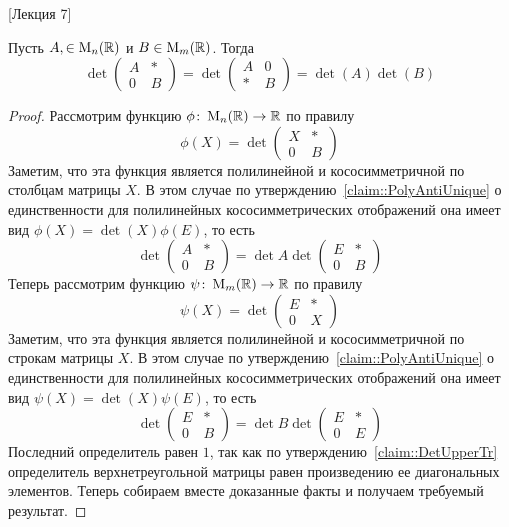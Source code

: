 [Лекция 7]


\begin{claim}
Пусть $A,\in\operatorname{M}_{n}(\mathbb R)$ и $B\in\operatorname{M}_{m}(\mathbb R)$. Тогда
\[
\det
\begin{pmatrix}
{A}&{*}\\
{0}&{B}
\end{pmatrix}
=
\det
\begin{pmatrix}
{A}&{0}\\
{*}&{B}
\end{pmatrix}
=
\det(A) \det(B)
\]
\end{claim}
\begin{proof}
Рассмотрим функцию $\phi\colon \operatorname{M}_{n}(\mathbb R)\to \mathbb R$ по правилу
\[
\phi(X) = 
\det
\begin{pmatrix}
{X}&{*}\\
{0}&{B}
\end{pmatrix}
\]
Заметим, что эта функция является полилинейной и кососимметричной по столбцам матрицы $X$. В этом случае по утверждению~\ref{claim::PolyAntiUnique} о единственности для полилинейных кососимметрических отображений она имеет вид $\phi(X) = \det(X)\phi(E)$, то есть
\[
\det
\begin{pmatrix}
{A}&{*}\\
{0}&{B}
\end{pmatrix}
=
\det A
\det
\begin{pmatrix}
{E}&{*}\\
{0}&{B}
\end{pmatrix}
\]
Теперь рассмотрим функцию $\psi\colon \operatorname{M}_{m}(\mathbb R)\to \mathbb R$ по правилу
\[
\psi(X) =
\det
\begin{pmatrix}
{E}&{*}\\
{0}&{X}
\end{pmatrix}
\]
Заметим, что эта функция является полилинейной и кососимметричной по строкам матрицы $X$. В этом случае по утверждению~\ref{claim::PolyAntiUnique} о единственности для полилинейных кососимметрических отображений она имеет вид $\psi(X) = \det(X)\psi(E)$, то есть
\[
\det
\begin{pmatrix}
{E}&{*}\\
{0}&{B}
\end{pmatrix}
=
\det B
\det
\begin{pmatrix}
{E}&{*}\\
{0}&{E}
\end{pmatrix}
\]
Последний определитель равен $1$, так как по утверждению~\ref{claim::DetUpperTr} определитель верхнетреугольной матрицы равен произведению ее диагональных элементов. Теперь собираем вместе доказанные факты и получаем требуемый результат.
\end{proof}

